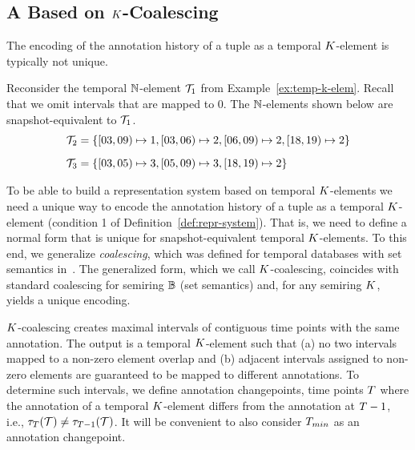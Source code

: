 \subsection{A  Based on $K$-Coalescing}
\label{sec:coalescing}

The encoding of the annotation history of a tuple as a temporal $K$-element is typically not unique.

\begin{exam}\label{ex:non-unique-concrete-temp-k-elem}
Reconsider the temporal ${\mathbb{N}}$-element $\mathcal{T}_1$ from Example~\ref{ex:temp-k-elem}. Recall that we omit intervals that are mapped to $0$. The ${\mathbb{N}}$-elements shown below are snapshot-equivalent to $\mathcal{T}_1$.
  \begin{align*}
    &\mathcal{T}_2 = \{[03, 09) \mapsto 1, [03,06) \mapsto 2, [06,09) \mapsto 2, [18,19) \mapsto 2\} \\[2mm]
    &\mathcal{T}_3 = \{[03, 05) \mapsto 3, [05,09) \mapsto 3, [18,19) \mapsto 2\}
  \end{align*}
\end{exam}

To be able to build a representation system based on temporal $K$-elements we need a unique way to encode the annotation history of a tuple as a  temporal $K$-element (condition 1 of Definition~\ref{def:repr-system}). %
That is, we need to define a normal form that is unique for snapshot-equivalent temporal $K$-elements. %
To this end, we generalize \textit{coalescing}, which was defined for temporal databases with set semantics in~\cite{DBLP:journals/tods/Snodgrass87,DBLP:conf/vldb/BohlenSS96}. The generalized form, which we call $K$-coalescing, coincides with standard coalescing for semiring $\mathbb{B}$ (set semantics) and, for any semiring $K$, yields a unique encoding. %

$K$-coalescing creates maximal intervals of contiguous time points
with the same annotation. The output is a temporal $K$-element such that
(a) no two intervals mapped to a non-zero element overlap and (b)
adjacent intervals assigned to non-zero elements are guaranteed to be
mapped to different annotations. To determine such intervals, we
define annotation changepoints, time points $T$ where the annotation of a temporal $K$-element differs from the annotation at $T - 1$, i.e., $\tau_{T}(\mathcal{T}) \neq \tau_{T-1}(\mathcal{T})$. It will be convenient to also
consider $T_{min}$ as an annotation
changepoint. %

